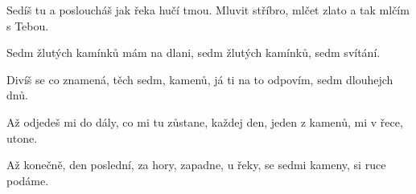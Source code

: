 
\beginverse{}
Sedíš tu a posloucháš
jak řeka hučí tmou.
Mluvit stříbro, mlčet zlato
a tak mlčím s Tebou.
\endverse{}

\beginchorus{}
Sedm žlutých kamínků mám na dlani,
sedm žlutých kamínků, sedm svítání.
\endchorus{}

\beginverse{}
Divíš se co znamená,
těch sedm, kamenů,
já ti na to odpovím,
sedm dlouhejch dnů.
\endverse{}

\beginchorus{}

\endchorus{}

\beginverse{}
Až odjedeš mi do dály,
co mi tu zůstane,
každej den, jeden z kamenů,
mi v řece, utone.
\endverse{}

\beginchorus{}

\endchorus{}

\beginverse{}
Až konečně, den poslední,
za hory, zapadne,
u řeky, se sedmi kameny,
si ruce podáme.
\endverse{}

\beginchorus{}

\endchorus{}

\endsong{}
